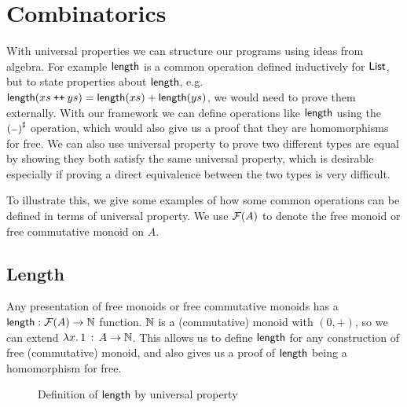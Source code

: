 \section{Combinatorics}
\label{sec:combinatorics}

With universal properties we can structure our programs using ideas from algebra.
For example $\operatorname{\mathsf{length}}$ is a common operation defined inductively for $\operatorname{\mathsf{List}}$,
but to state properties about $\operatorname{\mathsf{length}}$, e.g.
$\operatorname{\mathsf{length}}(xs \mathbin{\text{\ttfamily\upshape ++}} ys) = \operatorname{\mathsf{length}}(xs) + \operatorname{\mathsf{length}}(ys)$,
we would need to prove them externally. With our framework we can define operations like $\operatorname{\mathsf{length}}$
using the ${({\scriptstyle{-}})}^{\sharp}$ operation, which would also give us a proof that they are homomorphisms for free.
We can also use universal property to prove two different types are equal by showing they both
satisfy the same universal property, which is desirable especially if proving a direct equivalence between
the two types is very difficult.

To illustrate this, we give some examples of how some common operations can be defined
in terms of universal property.
We use $\mathcal{F}(A)$ to denote the free monoid or free commutative monoid on $A$.

\subsection{Length}

Any presentation of free monoids or free commutative monoids has a $\operatorname{\mathsf{length}} : \mathcal{F}(A) \to \mathbb{N}$ function.
$\mathbb{N}$ is a (commutative) monoid with $(0,+)$, so we can extend $\lambda x.\, 1\,:\,A \to \mathbb{N}$.
This allows us to define $\operatorname{\mathsf{length}}$ for any construction of free (commutative) monoid, and also
gives us a proof of $\operatorname{\mathsf{length}}$ being a homomorphism for free.

\begin{figure}[H]
    \centering
    \caption{Definition of $\operatorname{\mathsf{length}}$ by universal property}
    \label{fig:enter-label}
\end{figure}


